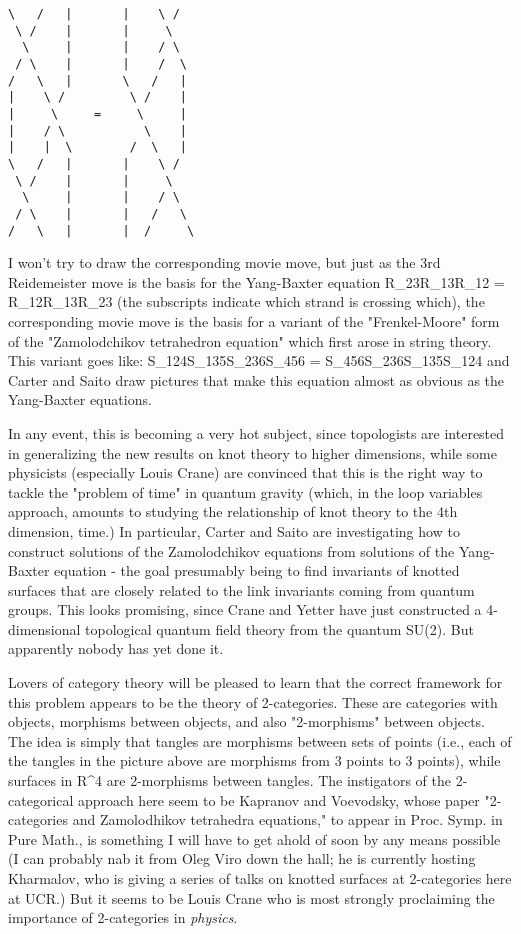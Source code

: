 \begin{verbatim}
\   /   |       |    \ /
 \ /    |       |     \
  \     |       |    / \
 / \    |       |    /  \
/   \   |       \   /   |
|    \ /         \ /    |
|     \     =     \     |
|    / \           \    |
|    |  \        /  \   |
\   /   |       |    \ /
 \ /    |       |     \
  \     |       |    / \
 / \    |       |   /   \
/   \   |       |  /     \
\end{verbatim}
    
I won't try to draw the corresponding movie move, but just as the
3rd Reidemeister move is the basis for the Yang-Baxter equation
R_{23}R_{13}R_{12} = R_{12}R_{13}R_{23} (the subscripts indicate
which strand is crossing which), the corresponding movie move is the
basis for a variant of the "Frenkel-Moore" form of the "Zamolodchikov 
tetrahedron equation" which first arose in string theory.  
This variant goes like:
S_{124}S_{135}S_{236}S_{456} = S_{456}S_{236}S_{135}S_{124}
and Carter and Saito draw pictures that make this equation almost as
obvious as the Yang-Baxter equations.

In any event, this is becoming a very hot subject, since topologists
are interested in generalizing the new results on knot theory to 
higher dimensions, while some physicists (especially Louis Crane)
are convinced that this is the right way to tackle the "problem of
time" in quantum gravity (which, in the loop variables approach, amounts
to studying the relationship of knot theory to the 4th dimension, time.)
In particular, Carter and Saito are investigating how to construct
solutions of the Zamolodchikov equations from solutions of the Yang-Baxter
equation - the goal presumably being to find invariants of knotted surfaces
that are closely related to the link invariants coming from quantum groups.
This looks promising, since Crane and Yetter have just constructed a
4-dimensional topological quantum field theory from the quantum SU(2).  
But apparently nobody has yet done it.  

Lovers of category theory will be pleased to learn that the correct framework 
for this problem appears to be the theory of 2-categories.  These are 
categories with objects, morphisms between objects, and also 
"2-morphisms" between objects.  The idea is simply that tangles are morphisms
between sets of points (i.e., each of the tangles in the picture above
are morphisms from 3 points to 3 points), while surfaces in R^4 are
2-morphisms between tangles.  The instigators of the 2-categorical
approach here seem to be Kapranov and Voevodsky, whose paper "2-categories
and Zamolodhikov tetrahedra equations," to appear in Proc. Symp. in Pure
Math., is something I will have to get ahold of soon by any means possible
(I can probably nab it from Oleg Viro down the hall; he is currently 
hosting Kharmalov, who is giving a series of talks on knotted surfaces
at 2-categories here at UCR.)  But it seems to be Louis Crane who is most
strongly proclaiming the importance of 2-categories in \emph{physics}.


